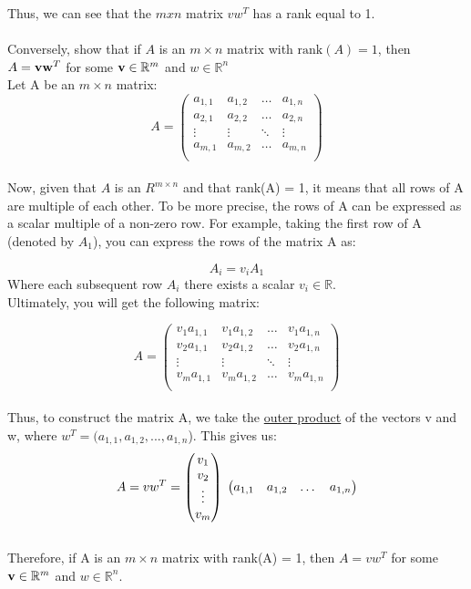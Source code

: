 \documentclass{article}
\begin{document}
\noindent{}Thus, we can see that the $mxn$ matrix $vw^T$ has a rank equal to 1.\\\\

 Conversely, show that if $A$ is an $m \times n$ matrix with $\mathrm{rank}
(A) = 1$, then $A = {\bf v} {\bf w}^T$ for some ${\bf v} \in \mathbb{R}^m$ and $w \in \mathbb{R}^n$\\

\noindent Let A be an $m \times n$ matrix:
\[
A = 
\begin{pmatrix}
a_{1,1} & a_{1,2} & \dots & a_{1,n}\\
a_{2,1} & a_{2,2} & \dots & a_{2,n}\\
\vdots & \vdots & \ddots & \vdots\\
a_{m,1} & a_{m,2} & \dots & a_{m,n}\\
\end{pmatrix}
\]\\

\noindent Now, given that $A$ is an $R^{m \times n}$ and that rank(A) = 1, it means that all rows of A are multiple of each other. To be more precise, the rows of A can be expressed as a scalar multiple of a non-zero row. For example, taking the first row of A (denoted by $A_1$), you can express the rows of the matrix A as:

\[
A_i = v_iA_1
\]
Where each subsequent row $A_i$ there exists a scalar $v_i \in \mathbb{R}$.\\

\noindent Ultimately, you will get the following matrix:

\[
A = 
\begin{pmatrix}
v_1a_{1,1} & v_1a_{1,2} & \dots & v_1a_{1,n}\\
v_2a_{1,1} & v_2a_{1,2} & \dots & v_2a_{1,n}\\
\vdots & \vdots & \ddots & \vdots\\
v_ma_{1,1} & v_ma_{1,2} & \dots & v_ma_{1,n}\\
\end{pmatrix}
\]\\

\noindent Thus, to construct the matrix A, we take the \underline{outer product} of the vectors v and w, where $w^T = (a_{1,1}, a_{1,2}, ..., a_{1,n}$). This gives us:\\
\[
A = vw^T = 
\begin{pmatrix}
v_1 \\
v_2 \\
\vdots \\
v_m
\end{pmatrix}
\hspace{0.1cm}
\begin{pmatrix}
a_{1,1} & a_{1,2} & \dots & a_{1,n}
\end{pmatrix}
\]\\

\noindent Therefore, if A is an $m \times n$ matrix with rank(A) = 1, then $A = vw^T$ for some ${\bf v} \in \mathbb{R}^m$ and $w \in \mathbb{R}^n$.\\
\end{document}
